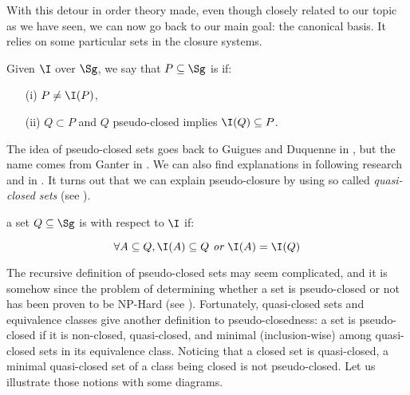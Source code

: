 With this detour in order theory made, even though closely related to our topic
as we have seen, we can now go back to our main goal: the canonical basis. It
relies on some particular sets in the closure systems.

\begin{definition} Given $\I$ over $\Sg$, we say
	that $P \subseteq \Sg$ is  if:
	\begin{itemize}
		\item[(i)] $P \neq \I(P)$,
		\item[(ii)] $Q \subset P$ and $Q$ pseudo-closed implies $\I(Q) 
		\subseteq P$.
	\end{itemize}
\end{definition}

\noindent The idea of pseudo-closed sets goes back to Guigues and Duquenne in
\cite{guigues_familles_1986}, but the name comes from Ganter in 
\cite{ganter_two_2010}. We can also find explanations in following 
research \cite{ganter_two_2010, day_lattice_1992} and
in \cite{ganter_conceptual_2016}. It turns out that we can explain 
pseudo-closure by using so called \textit{quasi-closed sets} (see 
\cite{wild_implicational_1989, ganter_two_2010, guigues_familles_1986}). 

\begin{definition} a set $Q \subseteq \Sg$ is 
	 with respect to $\I$ if:
	
	\[ \forall A \subseteq Q, \I(A) \subseteq Q \textit{ or } \I(A) = 
	\I(Q) \]
	
\end{definition}

\noindent The recursive definition of pseudo-closed sets may seem complicated,
and it is somehow since the problem of determining whether a set is 
pseudo-closed or not has been proven to be NP-Hard (see 
\cite{babin_computing_2013}). Fortunately, quasi-closed sets and 
equivalence classes give another definition to pseudo-closedness: a set is 
pseudo-closed if it is non-closed, quasi-closed, and minimal (inclusion-wise) among quasi-closed sets in its equivalence class. Noticing that a closed set is quasi-closed, a minimal quasi-closed set of a class being closed is not pseudo-closed. Let us illustrate those notions with some diagrams.


